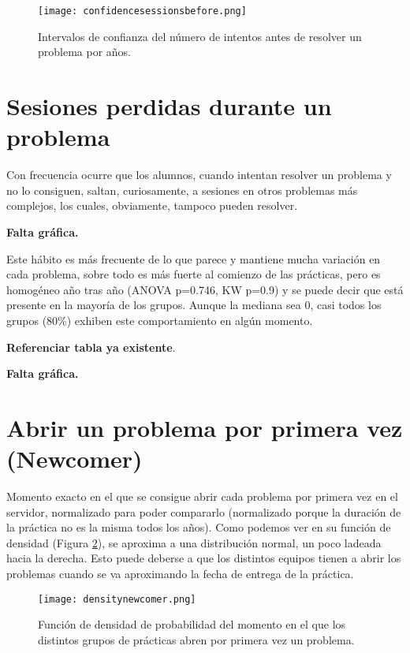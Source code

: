 \begin{figure}[H]
    \centering
    \texttt{[image: confidencesessionsbefore.png]}
    \caption{Intervalos de confianza del número de intentos antes de resolver un problema por años.}
    \label{fig:confidencesessionsbefore}
\end{figure}

\section{Sesiones perdidas durante un problema}

Con frecuencia ocurre que los alumnos, cuando intentan resolver un problema y no lo consiguen, saltan, curiosamente, a sesiones en otros problemas más complejos, los cuales, obviamente, tampoco pueden resolver.

\textbf{Falta gráfica.}

Este hábito es más frecuente de lo que parece y mantiene mucha variación en cada problema, sobre todo es más fuerte al comienzo de las prácticas, pero es homogéneo año tras año (ANOVA p=0.746, KW p=0.9) y se puede decir que está presente en la mayoría de los grupos. Aunque la mediana sea 0, casi todos los grupos (80\%) exhiben este comportamiento en algún momento.

\textbf{Referenciar tabla ya existente}.

\textbf{Falta gráfica.}

\section{Abrir un problema por primera vez (Newcomer)}

Momento exacto en el que se consigue abrir cada problema por primera vez en el servidor, normalizado para poder compararlo (normalizado porque la duración de la práctica no es la misma todos los años). Como podemos ver en su función de densidad (Figura \ref{fig:densityplotnewcomer}), se aproxima a una distribución normal, un poco ladeada hacia la derecha. Esto puede deberse a que los distintos equipos tienen a abrir los problemas cuando se va aproximando la fecha de entrega de la práctica.

\begin{figure}[H]
    \centering
    \texttt{[image: densitynewcomer.png]}
    \caption{Función de densidad de probabilidad del momento en el que los distintos grupos de prácticas abren por primera vez un problema.}
    \label{fig:densityplotnewcomer}
\end{figure}

